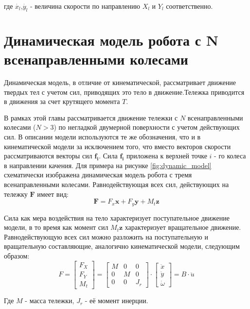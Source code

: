 \documentclass[oneside,final,14pt]{extreport}
\newcommand{\bs}{\boldsymbol}
\begin{document}
где $\dot{x_{l}}$,$\dot{y_{l}}$ - величина скорости по направлению $X_{l}$ и  $Y_{l}$ соответственно.
\fi

\chapter{Динамическая модель робота с N всенаправленными колесами}
Динамическая модель, в отличие от кинематической, рассматривает движение твердых тел с учетом сил, приводящих это тело в движение.Тележка приводится в движения за счет крутящего момента $T$. 
 
В рамках этой главы рассматривается движение тележки с $N$ всенаправленными колесами ($N > 3$) по негладкой двумерной поверхности с учетом действующих сил. В описании модели используются те же обозначения, что и в кинематической модели за исключением того, что вместо векторов скорости рассматриваются векторы сил $\bs{f_{i}}$. Сила $\bs{f_{i}}$ приложена к верхней точке $i$ - го колеса в направлении качения. Для примера на рисунке \ref{fig:dynamic_model} схематически изображена динамическая модель робота с тремя всенаправленными колесами. Равнодействующая всех сил, действующих на тележку $\bs{F}$ имеет вид:
\begin{equation}
\bs{F}
=
F_{x}\bs{x}
+
F_{y}\bs{y}
+
M_{t}\bs{z}
\end{equation} 

Сила как мера воздействия на тело характеризует поступательное движение модели, в то время как момент сил $M_{t}\bs{z}$ характеризует вращательное движение. Равнодействующую всех сил можно разложить на поступательную и вращательную составляющие, аналогично кинематической модели, следующим образом:
\begin{equation}
F
=
\begin{bmatrix}
F_{X} \\
F_{Y} \\
M_{t}
\end{bmatrix}
=
\begin{bmatrix}
M & 0 & 0 \\
0 & M & 0 \\
0 & 0 & J_{r}
\end{bmatrix}
\cdot
\begin{bmatrix}
\ddot{x}\\
\ddot{y} \\
\dot{\omega}
\end{bmatrix}
=
B \cdot \ddot{u}
\end{equation}

Где $M$ - масса тележки, $J_{r}$ - её момент инерции. 
\end{document}
